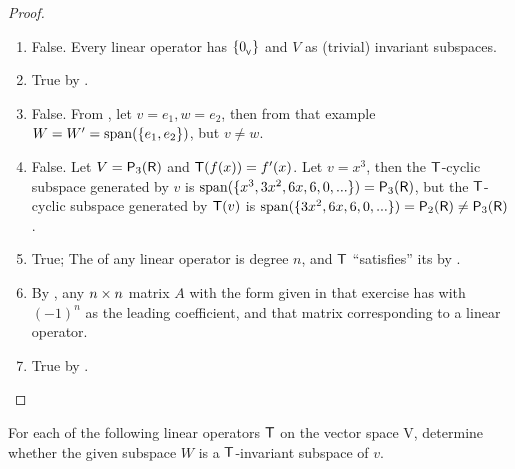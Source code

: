 \begin{proof} \ 

\begin{enumerate}
\item False. Every linear operator has \(\{ 0_{_{\textsf{V}}} \}\) and \(V\) as (trivial) invariant subspaces.
\item True by .
\item False.
From , let \(v = e_1, w = e_2\), then from that example \(W = W' = \operatorname{span}(\{ e_1, e_2 \})\), but \(v \ne w\).

\item False. Let \(V = \textsf{P}_3(\textsf{R})\) and \(\textsf{T}(f(x)) = f'(x)\).
Let \(v = x^3\), then the \(\textsf{T}\)-cyclic subspace generated by \(v\) is \(\operatorname{span}(\{ x^3, 3x^2, 6x, 6, 0, ... \}) = \textsf{P}_3(\textsf{R})\), but the \(\textsf{T}\)-cyclic subspace generated by \(\textsf{T}(v)\) is \(\operatorname{span}(\{ 3x^2, 6x, 6, 0, ... \}) = \textsf{P}_2(\textsf{R}) \ne \textsf{P}_3(\textsf{R})\).
\item True; The \CPOLY{} of any linear operator is degree \(n\), and \(\textsf{T}\) ``satisfies'' its \CPOLY{} by .
\item By , any \(n \times n\) matrix \(A\) with the form given in that exercise has \CPOLY{} with \((-1)^n\) as the leading coefficient, and that matrix corresponding to a linear operator.
\item True by .
\end{enumerate}
\end{proof}

\begin{exercise} \label{exercise 5.4.2}
For each of the following linear operators \(\textsf{T}\) on the vector space V, determine whether the given subspace \(W\) is a \(\textsf{T}\)-invariant subspace of \(v\).
\end{exercise}

